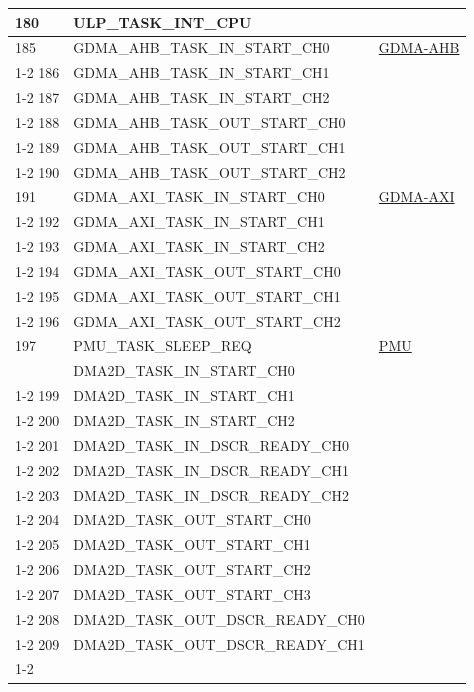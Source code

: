 \documentclass[main\_\_CN.tex]{subfiles}
\begin{document}
\begin{longtable}{ | l | l | l | }
180 & ULP\_TASK\_INT\_CPU & \\ \hline
185 & GDMA\_AHB\_TASK\_IN\_START\_CH0    & \hyperref[mod:dma]{GDMA-AHB}  \\ \cline{1-2}
186 & GDMA\_AHB\_TASK\_IN\_START\_CH1    & \\ \cline{1-2}
187 & GDMA\_AHB\_TASK\_IN\_START\_CH2    & \\ \cline{1-2}
188 & GDMA\_AHB\_TASK\_OUT\_START\_CH0   & \\ \cline{1-2}
189 & GDMA\_AHB\_TASK\_OUT\_START\_CH1   & \\ \cline{1-2}
190 & GDMA\_AHB\_TASK\_OUT\_START\_CH2   & \\ \hline
191 & GDMA\_AXI\_TASK\_IN\_START\_CH0    & \hyperref[mod:dma]{GDMA-AXI}  \\ \cline{1-2}
192 & GDMA\_AXI\_TASK\_IN\_START\_CH1    & \\ \cline{1-2}
193 & GDMA\_AXI\_TASK\_IN\_START\_CH2    & \\ \cline{1-2}
194 & GDMA\_AXI\_TASK\_OUT\_START\_CH0   & \\ \cline{1-2}
195 & GDMA\_AXI\_TASK\_OUT\_START\_CH1   & \\ \cline{1-2}
196 & GDMA\_AXI\_TASK\_OUT\_START\_CH2   & \\ \hline
197 & PMU\_TASK\_SLEEP\_REQ  & \hyperref[mod:lowpowm]{PMU} \\ \hline
\iftagged{ESP32-P4-latest}{%
198 & DMA2D\_TASK\_IN\_START\_CH0  & \nameref{mod:2ddma} \\ \cline{1-2}
199 & DMA2D\_TASK\_IN\_START\_CH1  & \\ \cline{1-2}
200 & DMA2D\_TASK\_IN\_START\_CH2  & \\ \cline{1-2}
201 & DMA2D\_TASK\_IN\_DSCR\_READY\_CH0  & \\ \cline{1-2}
202 & DMA2D\_TASK\_IN\_DSCR\_READY\_CH1  & \\ \cline{1-2}
203 & DMA2D\_TASK\_IN\_DSCR\_READY\_CH2  & \\ \cline{1-2}
204 & DMA2D\_TASK\_OUT\_START\_CH0  & \\ \cline{1-2}
205 & DMA2D\_TASK\_OUT\_START\_CH1  & \\ \cline{1-2}
206 & DMA2D\_TASK\_OUT\_START\_CH2  & \\ \cline{1-2}
207 & DMA2D\_TASK\_OUT\_START\_CH3  & \\ \cline{1-2}
208 & DMA2D\_TASK\_OUT\_DSCR\_READY\_CH0  & \\ \cline{1-2}
209 & DMA2D\_TASK\_OUT\_DSCR\_READY\_CH1  & \\ \cline{1-2}
}
\end{longtable}
\end{document}
